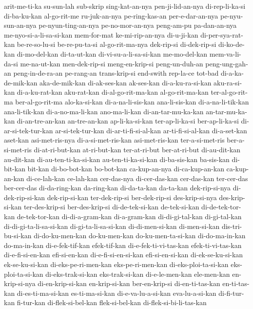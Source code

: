 {arit-me-ti-ka su-sun-lah sub-skrip sing-kat-an-nya pen-ji-lid-an-nya di-rep-li-ka-si di-ba-ku-kan al-go-rit-me
ru-juk-an-nya pe-ring-kas-an per-e-dar-an-nya pe-nyu-sun-an-nya pe-nyun-ting-an-nya pe-no-mor-an-nya peng-am-pu pa-dan-an-nya
me-nyo-si-a-li-sa-si-kan mem-for-mat ke-mi-rip-an-nya di-u-ji-kan di-per-sya-rat-kan be-re-so-lu-si be-re-pu-ta-si al-go-rit-ma-nya
dek-rip-si di-dek-rip-si di-ko-de-kan di-mo-del-kan di-ta-ut-kan di-vi-su-a-li-sa-si-kan me-mo-del-kan mem-va-li-da-si
me-na-ut-kan men-dek-rip-si meng-en-krip-si peng-un-duh-an peng-ung-gah-an peng-in-de-ra-an pe-rang-an trans-krip-si
end-swith rep-la-ce tot-bad di-a-ka-de-mik-kan aka-de-mik-kan di-ak-ses-kan ak-ses-kan di-a-ku-ra-si-kan
aku-ra-si-kan di-a-ku-rat-kan aku-rat-kan di-al-go-rit-ma-kan al-go-rit-ma-kan ter-al-go-rit-ma ber-al-go-rit-ma alo-ka-si-kan
di-a-na-li-sis-kan ana-li-sis-kan di-a-na-li-tik-kan ana-li-tik-kan di-a-no-ma-li-kan ano-ma-li-kan di-an-tar-mu-ka-kan an-tar-mu-ka-kan
di-an-tre-an-kan an-tre-an-kan ap-li-ka-si-kan ter-ap-li-ka-si ber-ap-li-ka-si di-ar-si-tek-tur-kan ar-si-tek-tur-kan di-ar-ti-fi-si-al-kan
ar-ti-fi-si-al-kan di-a-set-kan aset-kan asi-met-ris-nya di-a-si-met-ris-kan asi-met-ris-kan ter-a-si-met-ris ber-a-si-met-ris
di-at-ri-but-kan at-ri-but-kan ter-at-ri-but ber-at-ri-but di-au-dit-kan au-dit-kan di-au-ten-ti-ka-si-kan au-ten-ti-ka-si-kan
di-ba-sis-kan ba-sis-kan di-bit-kan bit-kan di-bo-bot-kan bo-bot-kan ca-kup-an-nya di-ca-kup-an-kan
ca-kup-an-kan di-ce-lah-kan ce-lah-kan cer-das-nya di-cer-das-kan cer-das-kan ter-cer-das ber-cer-das
di-da-ring-kan da-ring-kan di-da-ta-kan da-ta-kan dek-rip-si-nya di-dek-rip-si-kan dek-rip-si-kan ter-dek-rip-si
ber-dek-rip-si des-krip-si-nya des-krip-si-kan ter-des-krip-si ber-des-krip-si di-de-tek-si-kan de-tek-si-kan di-de-tek-tor-kan
de-tek-tor-kan di-di-a-gram-kan di-a-gram-kan di-di-gi-tal-kan di-gi-tal-kan di-di-gi-ta-li-sa-si-kan di-gi-ta-li-sa-si-kan di-di-men-si-kan
di-men-si-kan dis-tri-bu-si-kan di-do-ku-men-kan do-ku-men-kan do-ku-men-ta-si-kan di-do-ma-in-kan do-ma-in-kan di-e-fek-tif-kan
efek-tif-kan di-e-fek-ti-vi-tas-kan efek-ti-vi-tas-kan di-e-fi-si-en-kan efi-si-en-kan di-e-fi-si-en-si-kan efi-si-en-si-kan di-ek-se-ku-si-kan
ek-se-ku-si-kan di-eks-pe-ri-men-kan eks-pe-ri-men-kan di-eks-ploi-ta-si-kan eks-ploi-ta-si-kan di-eks-trak-si-kan eks-trak-si-kan di-e-le-men-kan
ele-men-kan en-krip-si-nya di-en-krip-si-kan en-krip-si-kan ber-en-krip-si di-en-ti-tas-kan en-ti-tas-kan di-es-ti-ma-si-kan
es-ti-ma-si-kan di-e-va-lu-a-si-kan eva-lu-a-si-kan di-fi-tur-kan fi-tur-kan di-flek-si-bel-kan flek-si-bel-kan di-flek-si-bi-li-tas-kan
}
